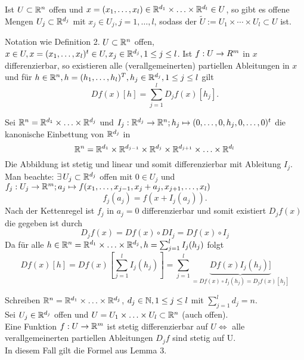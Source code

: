 \documentclass[../ana2.tex]{subfiles}
\begin{document}
\begin{bem}
    Ist \(U \subset \mathbb{R}^n\) offen und 
    \( x = (x_1, \ldots, x_l) 
    \in \mathbb{R}^{d_1} \times \ldots \times \mathbb{R}^{d_l} \in U \),
    so gibt es offene Mengen \( U_j \subset \mathbb{R}^{d_j} \) 
    mit \( x_j \in U_j, j = 1,\ldots, l \), sodass 
    der  \( \tilde{U} := U_1 \times \cdots \times U_l \subset U \) 
    ist.
\end{bem}
\begin{lem}
    Notation wie Definition 2. \( U \subset \mathbb{R}^n \) 
    offen, \( x \in U, x = (x_1, \ldots, x_l)^t \in U, 
    x_j \in \mathbb{R}^{d_j}, 1 \leq j \leq l \).
    Ist \(f:U\rightarrow R^m\) in \(x\) differenzierbar,
    so existieren alle (verallgemeinerten) partiellen 
    Ableitungen in \( x \) und für \( h \in \mathbb{R}^n, 
    h = (h_1, \ldots, h_l)^T, h_j \in \mathbb{R}^{d_j}, 1 \leq j \leq l \) 
    gilt 
    \[ Df(x)[h] = \sum_{j=1}^l D_j f(x)[h_j]. \]
\end{lem}
\begin{bew}
    Sei \(\mathbb{R}^n = \mathbb{R}^{d_1} \times \ldots \times \mathbb{R}^{d_j}\) und
    \( I_j:\mathbb{R}^{d_j}\rightarrow \mathbb{R}^n; h_j \mapsto (0, \ldots, 0, h_j, 0, \ldots, 0)^t \) 
    die kanonische Einbettung von \(\mathbb{R}^{d_j}\) in
    \[\mathbb{R}^n = \mathbb{R}^{d_1} \times \mathbb{R}^{d_{j-1}} \times \mathbb{R}^{d_j} 
    \times \mathbb{R}^{d_{j+1}} \times \ldots \times \mathbb{R}^{d_l}\]
    Die Abbildung ist stetig und linear und somit 
    differenzierbar mit Ableitung \( I_j \).\\
    Man beachte: \( \exists U_j \subset \R^{d_j} \) offen mit \(0 \in U_j\)
    und \(f_j:U_j\rightarrow \mathbb{R}^m; 
    a_j \mapsto f(x_1, \ldots, x_{j-1}, x_j + a_j, x_{j+1}, \ldots, x_l)\)
    \[ f_j(a_j) = f(x + I_j(a_j)). \]
    Nach der Kettenregel ist \( f_j \) in \( a_j = 0 \) 
    differenzierbar und somit existiert \( D_j f(x) \) 
    die gegeben ist durch 
    \[ D_j f(x) = Df(x) \circ DI_j 
    = Df(x) \circ I_j \tag{\(*\)} \]
    Da für alle \(h \in \mathbb{R}^n = \mathbb{R}^{d_1} \times \ldots \times \mathbb{R}^{d_j},
    h = \sum_{j=1}^l I_j(h_j) \) folgt
    \[ Df(x)[h] = Df(x)[\sum_{j=1}^l I_j(h_j)]
    = \sum_{j=1}^l 
    \underbrace{Df(x)I_j(h_j)]}_{= Df(x) \circ I_j(h_j) = D_jf(x)[h_j]} \]
\end{bew}
\begin{satz}
    Schreiben \( \mathbb{R}^n = \mathbb{R}^{d_1} \times \ldots \times \mathbb{R}^{d_j} \),
    \( d_j \in \mathbb{N} , 1 \leq j \leq l \) mit \( \sum_{j=1}^l d_j = n \).\\
    Sei \( U_j \in \mathbb{R}^{d_j} \) offen und 
    \( U = U_1 \times \ldots \times U_l \subset \mathbb{R}^n \) (auch offen).\\
    Eine Funktion \( f:U\rightarrow \mathbb{R}^m \) ist stetig differenzierbar auf 
    \( U \Leftrightarrow \) alle verallgemeinerten partiellen Ableitungen 
    \( D_jf \) sind stetig auf U.\\
    In diesem Fall gilt die Formel aus Lemma 3.
\end{satz}
\end{document}
